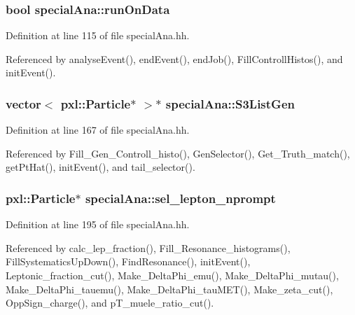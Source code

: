 \subsubsection[{run\-On\-Data}]{\setlength{\rightskip}{0pt plus 5cm}bool special\-Ana\-::run\-On\-Data}\label{classspecialAna_aad40cb68a6bfb77e015fd348b620fa4a}


Definition at line 115 of file special\-Ana.\-hh.



Referenced by analyse\-Event(), end\-Event(), end\-Job(), Fill\-Controll\-Histos(), and init\-Event().

\subsubsection[{S3\-List\-Gen}]{\setlength{\rightskip}{0pt plus 5cm}vector$<$ pxl\-::\-Particle$\ast$ $>$$\ast$ special\-Ana\-::\-S3\-List\-Gen}\label{classspecialAna_a401eeadc9b34b0278c2cdf45256e9baa}


Definition at line 167 of file special\-Ana.\-hh.



Referenced by Fill\-\_\-\-Gen\-\_\-\-Controll\-\_\-histo(), Gen\-Selector(), Get\-\_\-\-Truth\-\_\-match(), get\-Pt\-Hat(), init\-Event(), and tail\-\_\-selector().

\subsubsection[{sel\-\_\-lepton\-\_\-nprompt}]{\setlength{\rightskip}{0pt plus 5cm}pxl\-::\-Particle$\ast$ special\-Ana\-::sel\-\_\-lepton\-\_\-nprompt}\label{classspecialAna_a2bb3bd3f562063bd54fa72eb36a4d7de}


Definition at line 195 of file special\-Ana.\-hh.



Referenced by calc\-\_\-lep\-\_\-fraction(), Fill\-\_\-\-Resonance\-\_\-histograms(), Fill\-Systematics\-Up\-Down(), Find\-Resonance(), init\-Event(), Leptonic\-\_\-fraction\-\_\-cut(), Make\-\_\-\-Delta\-Phi\-\_\-emu(), Make\-\_\-\-Delta\-Phi\-\_\-mutau(), Make\-\_\-\-Delta\-Phi\-\_\-tauemu(), Make\-\_\-\-Delta\-Phi\-\_\-tau\-M\-E\-T(), Make\-\_\-zeta\-\_\-cut(), Opp\-Sign\-\_\-charge(), and p\-T\-\_\-muele\-\_\-ratio\-\_\-cut().


